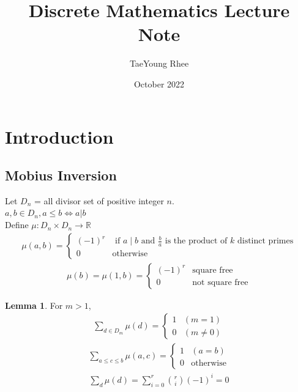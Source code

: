 \documentclass{article}
\title{Discrete Mathematics Lecture Note}
\author{TaeYoung Rhee}
\date{October 2022}
\theoremstyle{definition}
\newtheorem{lm}{Lemma}
\begin{document}
\maketitle

\section{Introduction}
\subsection{Mobius Inversion}
Let $D_n$ = all divisor set of positive integer $n$. \\
$a, b \in D_n, a \le b \Leftrightarrow a \vert b$  \\ 
Define $\mu : D_n \times  D_n \rightarrow \mathbb{R}$ 
\begin{align*}
    \mu(a,b) =
    \begin{cases}
        (-1)^r & \text{ if } a \;\vert\; b \text{ and } \frac{b}{a} 
        \text{ is the product of } k \text{ distinct primes} \\ 
        0 & \text{otherwise}
    \end{cases}
\end{align*}
\begin{align*}
    \mu (b) = \mu (1, b) = 
    \begin{cases}
        (-1)^r & \text{square free} \\ 
        0 & \text{not square free} 
    \end{cases}
\end{align*}
\begin{lm}
    For $m > 1$, 
    \begin{align*}
        \sum_{d \in D_m} \mu (d) =
        \begin{cases}
            1 & (m=1) \\ 
            0 & (m \ne 0) 
        \end{cases}
    \end{align*}
    \begin{align*}
        \sum_{a \le c \le b} \mu (a, c) = 
        \begin{cases}
            1 &  (a=b) \\ 
            0 & \text{otherwise}
        \end{cases}
    \end{align*}
    \begin{align*}
        \sum_{d} \mu (d) = \sum_{i=0}^{r} {r \choose i} (-1)^i = 0
    \end{align*}
\end{lm}
\end{document}
